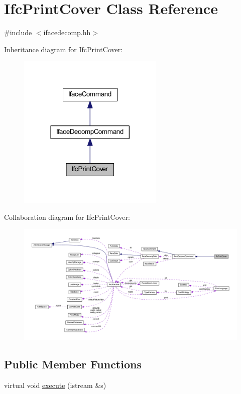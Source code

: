 \hypertarget{class_ifc_print_cover}{}\section{Ifc\+Print\+Cover Class Reference}
\label{class_ifc_print_cover}


{\ttfamily \#include $<$ifacedecomp.\+hh$>$}



Inheritance diagram for Ifc\+Print\+Cover\+:
\nopagebreak
\begin{figure}[H]
\begin{center}
\leavevmode
\includegraphics[width=197pt]{class_ifc_print_cover__inherit__graph}
\end{center}
\end{figure}


Collaboration diagram for Ifc\+Print\+Cover\+:
\nopagebreak
\begin{figure}[H]
\begin{center}
\leavevmode
\includegraphics[width=350pt]{class_ifc_print_cover__coll__graph}
\end{center}
\end{figure}
\subsection*{Public Member Functions}
\begin{DoxyCompactItemize}
\item 
virtual void \mbox{\hyperlink{class_ifc_print_cover_a8869c00a9bbd7cecc498d1b675bc4bfe}{execute}} (istream \&s)
\end{DoxyCompactItemize}
